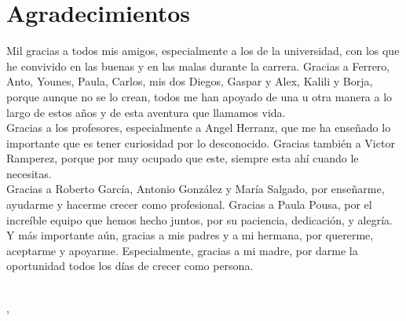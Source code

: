 \ifspanish
\else
\fi

%
%
\cleardoublepage
{} %

\chapter*{Agradecimientos} %

Mil gracias a todos mis amigos, especialmente a los de la universidad, con los que he convivido en las buenas y en las malas durante la carrera. Gracias a Ferrero, Anto, Younes, Paula, Carlos, mis dos Diegos, Gaspar y Alex, Kalili y Borja, porque aunque no se lo crean, todos me han apoyado de una u otra manera a lo largo de estos años y de esta aventura que llamamos vida. \\

Gracias a los profesores, especialmente a Angel Herranz, que me ha enseñado lo importante que es tener curiosidad por lo desconocido. Gracias también a Victor Ramperez, porque por muy ocupado que este, siempre esta ahí cuando le necesitas. \\

Gracias a Roberto García, Antonio González y María Salgado, por enseñarme, ayudarme y hacerme crecer como profesional. Gracias a Paula Pousa, por el increíble equipo que hemos hecho juntos, por su paciencia, dedicación, y alegría. \\

Y más importante aún, gracias a mis padres y a mi hermana, por quererme, aceptarme y apoyarme. Especialmente, gracias a mi madre, por darme la oportunidad todos los días de crecer como persona. 

\makeatletter		
\begin{flushright}
	\vspace{1,5cm}
	\textit{\@autor}\\
	\@lugarDef, \@yearDef
\end{flushright}
\makeatother
